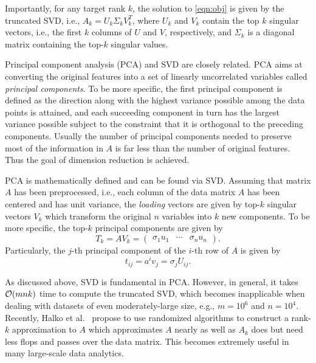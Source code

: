  
Importantly, for any target rank $k$, the solution to \eqref{eqn:obj} is given by the truncated SVD, i.e., $A_k = U_k \Sigma_k V_k^T$, where $U_k$ and $V_k$ contain the top $k$ singular vectors, i.e., the first $k$ columns of $U$ and $V$, respectively, and $\Sigma_k$ is a diagonal matrix containing the top-$k$ singular values.

Principal component analysis (PCA) and SVD are closely related.
PCA aims at converting the original features into a set of linearly uncorrelated variables called {\it principal components}.
To be more specific, the first principal component is defined as the direction along with the highest variance possible among the data points is attained, and each succeeding component in turn has the largest variance possible subject to the constraint that it is orthogonal to the preceding components.
Usually the number of principal components needed to preserve most of the information in $A$ is far less than the number of original features. Thus the goal of dimension reduction is achieved.

PCA is mathematically defined and can be found via SVD.
Assuming that matrix $A$ has been preprocessed, i.e., each column of the data matrix $A$ has been centered and has unit variance, the {\it loading} vectors are given by top-$k$ singular vectors $V_k$ which transform the original $n$ variables into $k$ new components. To be more specific, the top-$k$ principal components are given by 
\begin{equation}
  T_k = A V_k = \begin{pmatrix} \sigma_1 u_1 & \cdots & \sigma_n u_n \end{pmatrix}.
\end{equation}
Particularly, the $j$-th principal component of the $i$-th row of $A$ is given by 
\begin{equation}
  t_{ij} = a^i v_j = \sigma_j U_{ij}.
\end{equation}

As discussed above, SVD is fundamental in PCA. However, in general, it takes $\operatorname{\mathcal{O}}(mnk)$ time to compute the truncated SVD, which becomes inapplicable when dealing with datasets of even moderately-large size, e.g., $m = 10^6$ and $n = 10^4$. Recently, Halko et al.~\cite{HMT11} propose to use randomized algorithms to construct a rank-$k$ approximation to $A$ which approximates $A$ nearly as well as $A_k$ does but need less flops and passes over the data matrix. This becomes extremely useful in many large-scale data analytics.


